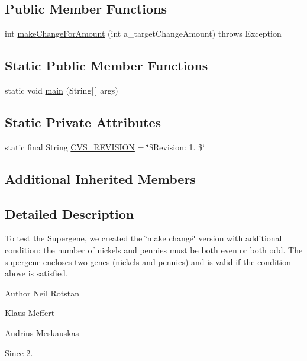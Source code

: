 \subsection*{Public Member Functions}
\begin{DoxyCompactItemize}
\item 
int \hyperlink{classexamples_1_1supergene_1_1_supergene_sample_a367571e3fe1b537e62559d15a817ac6d}{make\-Change\-For\-Amount} (int a\-\_\-target\-Change\-Amount)  throws Exception 
\end{DoxyCompactItemize}
\subsection*{Static Public Member Functions}
\begin{DoxyCompactItemize}
\item 
static void \hyperlink{classexamples_1_1supergene_1_1_supergene_sample_a2be1aa8c7ed3e5c9a654228822114321}{main} (String\mbox{[}$\,$\mbox{]} args)
\end{DoxyCompactItemize}
\subsection*{Static Private Attributes}
\begin{DoxyCompactItemize}
\item 
static final String \hyperlink{classexamples_1_1supergene_1_1_supergene_sample_af1f9312014229e3a141cc3a66aba975e}{C\-V\-S\-\_\-\-R\-E\-V\-I\-S\-I\-O\-N} = \char`\"{}\$Revision\-: 1. \$\char`\"{}
\end{DoxyCompactItemize}
\subsection*{Additional Inherited Members}


\subsection{Detailed Description}
To test the Supergene, we created the \char`\"{}make change\char`\"{} version with additional condition\-: the number of nickels and pennies must be both even or both odd. The supergene encloses two genes (nickels and pennies) and is valid if the condition above is satisfied.

\begin{DoxyAuthor}{Author}
Neil Rotstan 

Klaus Meffert 

Audrius Meskauskas 
\end{DoxyAuthor}
\begin{DoxySince}{Since}
2. 
\end{DoxySince}


